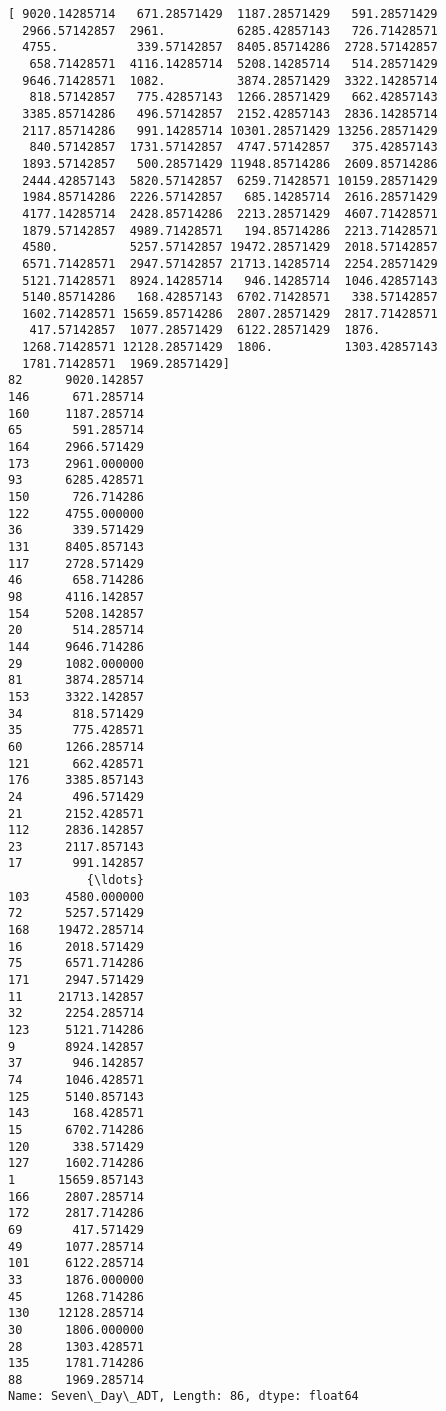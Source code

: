 \documentclass[11pt]{article}
\begin{document}
    \begin{Verbatim}[commandchars=\\\{\}]
[ 9020.14285714   671.28571429  1187.28571429   591.28571429
  2966.57142857  2961.          6285.42857143   726.71428571
  4755.           339.57142857  8405.85714286  2728.57142857
   658.71428571  4116.14285714  5208.14285714   514.28571429
  9646.71428571  1082.          3874.28571429  3322.14285714
   818.57142857   775.42857143  1266.28571429   662.42857143
  3385.85714286   496.57142857  2152.42857143  2836.14285714
  2117.85714286   991.14285714 10301.28571429 13256.28571429
   840.57142857  1731.57142857  4747.57142857   375.42857143
  1893.57142857   500.28571429 11948.85714286  2609.85714286
  2444.42857143  5820.57142857  6259.71428571 10159.28571429
  1984.85714286  2226.57142857   685.14285714  2616.28571429
  4177.14285714  2428.85714286  2213.28571429  4607.71428571
  1879.57142857  4989.71428571   194.85714286  2213.71428571
  4580.          5257.57142857 19472.28571429  2018.57142857
  6571.71428571  2947.57142857 21713.14285714  2254.28571429
  5121.71428571  8924.14285714   946.14285714  1046.42857143
  5140.85714286   168.42857143  6702.71428571   338.57142857
  1602.71428571 15659.85714286  2807.28571429  2817.71428571
   417.57142857  1077.28571429  6122.28571429  1876.
  1268.71428571 12128.28571429  1806.          1303.42857143
  1781.71428571  1969.28571429]
82      9020.142857
146      671.285714
160     1187.285714
65       591.285714
164     2966.571429
173     2961.000000
93      6285.428571
150      726.714286
122     4755.000000
36       339.571429
131     8405.857143
117     2728.571429
46       658.714286
98      4116.142857
154     5208.142857
20       514.285714
144     9646.714286
29      1082.000000
81      3874.285714
153     3322.142857
34       818.571429
35       775.428571
60      1266.285714
121      662.428571
176     3385.857143
24       496.571429
21      2152.428571
112     2836.142857
23      2117.857143
17       991.142857
           {\ldots}     
103     4580.000000
72      5257.571429
168    19472.285714
16      2018.571429
75      6571.714286
171     2947.571429
11     21713.142857
32      2254.285714
123     5121.714286
9       8924.142857
37       946.142857
74      1046.428571
125     5140.857143
143      168.428571
15      6702.714286
120      338.571429
127     1602.714286
1      15659.857143
166     2807.285714
172     2817.714286
69       417.571429
49      1077.285714
101     6122.285714
33      1876.000000
45      1268.714286
130    12128.285714
30      1806.000000
28      1303.428571
135     1781.714286
88      1969.285714
Name: Seven\_Day\_ADT, Length: 86, dtype: float64

    \end{Verbatim}
\end{document}
